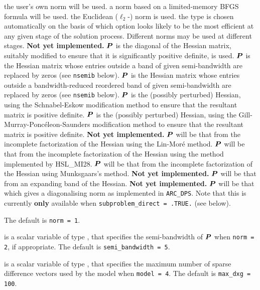 \documentclass{galahad}
\newcommand{\packagename}{ARC}
\begin{document}
\begin{description}
\begin{description}
 the user's own norm will be used.
 a norm based on a limited-memory BFGS formula will be used.
 the Euclidean ($\ell_2$-) norm is used.
 the type is chosen automatically on the basis of which option looks
        likely to be the most efficient at any given stage of the solution
        process. Different norms may be used at different stages.
        {\bf Not yet implemented.}
 ${\bm{P}}$ is the diagonal of the Hessian matrix, suitably modified to
        ensure that it is significantly positive definite, is used.
 ${\bm{P}}$ is the Hessian matrix whose entries outside a band of
         given semi-bandwidth are replaced by zeros
        (see {\tt nsemib} below).
 ${\bm{P}}$ is the Hessian matrix whose entries outside a
        bandwidth-reduced reordered band of given semi-bandwidth are
        replaced by zeros (see {\tt nsemib} below).
 ${\bm{P}}$ is the (possibly perturbed) Hessian,
         using the Schnabel-Eskow modification
        method to ensure that the resultant matrix is positive definite.
 ${\bm{P}}$ is the (possibly perturbed) Hessian,
        using the Gill-Murray-Ponc\'{e}leon-Saunders
        modification method to ensure that the resultant matrix is
        positive definite.
        {\bf Not yet implemented.}
 ${\bm{P}}$ will be that from the incomplete factorization of the Hessian
        using the Lin-Mor\'{e} method.
 ${\bm{P}}$ will be that from the incomplete factorization of the Hessian
        using the method implemented by HSL\_MI28.
 ${\bm{P}}$ will be that from the incomplete factorization of the Hessian
        using Munksgaars's method. {\bf Not yet implemented.}
 ${\bm{P}}$ will be that from an expanding band of the Hessian.
        {\bf Not yet implemented.}
 ${\bm{P}}$ will be that which gives a diagonalising norm as implemented in
         {\tt \packagename\_DPS}. Note that this is currently {\bf only}
         available when {\tt subproblem\_direct = .TRUE.} (see below).
\end{description}
The default is {\tt norm = 1}.

 is a scalar variable of type \integer,
that specifies
the semi-bandwidth of ${\bm{P}}$ when {\tt norm = 2},
if appropriate.
The default is {\tt semi\_bandwidth = 5}.

 is a scalar variable of type \integer,
that specifies the maximum number of sparse difference
vectors used by the model when {\tt model = 4}.
The default is {\tt max\_dxg = 100}.


\end{description}
\end{document}
